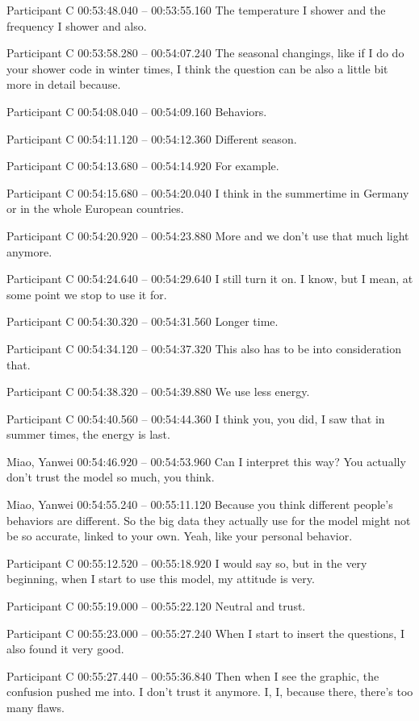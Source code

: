 {Participant C 00:53:48.040 -- 00:53:55.160
The temperature I shower and the frequency I shower and also.

Participant C 00:53:58.280 -- 00:54:07.240
The seasonal changings, like if I do do your shower code in winter times, I think the question can be also a little bit more in detail because.

Participant C 00:54:08.040 -- 00:54:09.160
Behaviors.

Participant C 00:54:11.120 -- 00:54:12.360
Different season.

Participant C 00:54:13.680 -- 00:54:14.920
For example.

Participant C 00:54:15.680 -- 00:54:20.040
I think in the summertime in Germany or in the whole European countries.

Participant C 00:54:20.920 -- 00:54:23.880
More and we don't use that much light anymore.

Participant C 00:54:24.640 -- 00:54:29.640
I still turn it on. I know, but I mean, at some point we stop to use it for.

Participant C 00:54:30.320 -- 00:54:31.560
Longer time.

Participant C 00:54:34.120 -- 00:54:37.320
This also has to be into consideration that.

Participant C 00:54:38.320 -- 00:54:39.880
We use less energy.

Participant C 00:54:40.560 -- 00:54:44.360
I think you, you did, I saw that in summer times, the energy is last.

Miao, Yanwei 00:54:46.920 -- 00:54:53.960
Can I interpret this way? You actually don't trust the model so much, you think.

Miao, Yanwei 00:54:55.240 -- 00:55:11.120
Because you think different people's behaviors are different. So the big data they actually use for the model might not be so accurate, linked to your own. Yeah, like your personal behavior.

Participant C 00:55:12.520 -- 00:55:18.920
I would say so, but in the very beginning, when I start to use this model, my attitude is very.

Participant C 00:55:19.000 -- 00:55:22.120
Neutral and trust.

Participant C 00:55:23.000 -- 00:55:27.240
When I start to insert the questions, I also found it very good.

Participant C 00:55:27.440 -- 00:55:36.840
Then when I see the graphic, the confusion pushed me into. I don't trust it anymore. I, I, because there, there's too many flaws.

}
